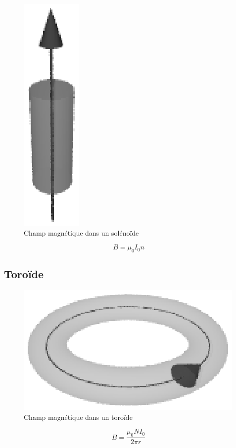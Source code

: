 \documentclass[a4paper,10pt,openright,titlepage]{report}
\begin{document}
\begin{figure}[!h]
\centering
\includegraphics{solenoide.eps}
\caption{Champ magnétique dans un solénoïde}
\end{figure}

$$B = \mu_0 I_0 n$$

\newpage

\subsection{Toroïde}

\begin{figure}[!h]
\centering
\includegraphics{toroide.eps}
\caption{Champ magnétique dans un toroïde}
\end{figure}

$$B = \frac{\mu_0 N I_0}{2 \pi r}$$
\end{document}
